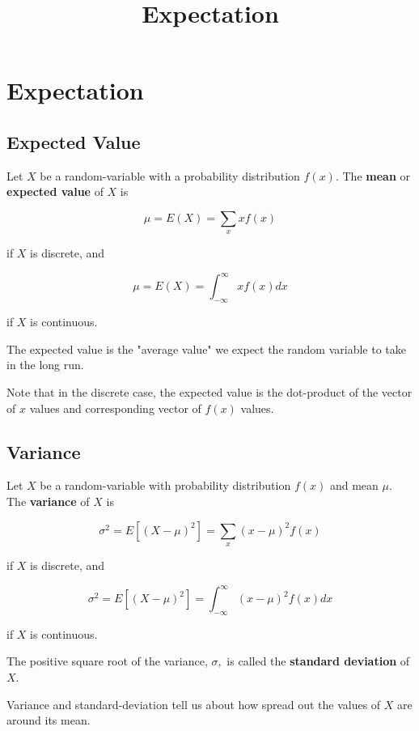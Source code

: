 \documentclass{article}
\title{Expectation}
\begin{document}
\section{Expectation}

\subsection{Expected Value}

\begin{definition}
Let $X$ be a \@{random-variable} with a \@{probability distribution} $f(x).$ The \textbf{mean} or \textbf{expected value} of $X$ is

\[ \mu = E(X) = \sum_{x}{x f(x)} \]

if $X$ is \@{discrete}, and

\[ \mu = E(X) = \int_{-\infty}^{\infty}{x f(x) dx} \]

if $X$ is \@{continuous}.

The expected value is the "average value" we expect the random variable to take in the long run.

Note that in the discrete case, the expected value is the \@{dot-product} of the \@{vector} of $x$ values and corresponding vector of $f(x)$ values.
\end{definition}

\subsection{Variance}

\begin{definition}[Variance]
Let $X$ be a \@{random-variable} with \@{probability distribution} $f(x)$ and mean $\mu.$ The \textbf{variance} of $X$ is

\[ \sigma^2 = E[(X - \mu)^2] = \sum_{x}{(x - \mu)^2 f(x)} \]

if $X$ is \@{discrete}, and

\[ \sigma^2 = E[(X - \mu)^2] = \int_{-\infty}^{\infty}{(x - \mu)^2 f(x) dx} \]

if $X$ is \@{continuous}.
\end{definition}

\begin{definition}
The positive square root of the \@{variance}, $\sigma,$ is called the \textbf{standard deviation} of $X.$
\end{definition}

\begin{intuition}\label{variance-interpretation}
\@{Variance} and \@{standard-deviation} tell us about how spread out the values of $X$ are around its mean.
\end{intuition}
\end{document}
